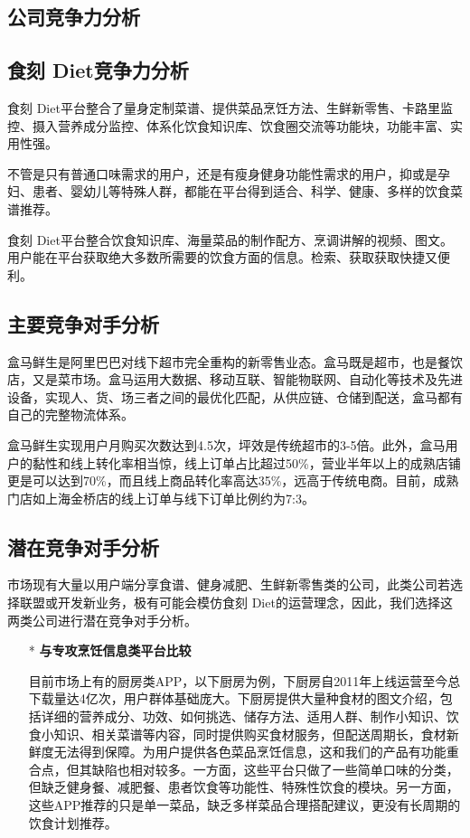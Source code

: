 \documentclass[UTF8,12pt]{ctexart}
\numberwithin{figure}{section}%
\begin{document}
\begin{spacing}{2}
\newpage
\section{公司竞争力分析}
\subsection{食刻 Diet竞争力分析}
食刻 Diet平台整合了量身定制菜谱、提供菜品烹饪方法、生鲜新零售、卡路里监控、摄入营养成分监控、体系化饮食知识库、饮食圈交流等功能块，功能丰富、实用性强。

不管是只有普通口味需求的用户，还是有瘦身健身功能性需求的用户，抑或是孕妇、患者、婴幼儿等特殊人群，都能在平台得到适合、科学、健康、多样的饮食菜谱推荐。

食刻 Diet平台整合饮食知识库、海量菜品的制作配方、烹调讲解的视频、图文。用户能在平台获取绝大多数所需要的饮食方面的信息。检索、获取获取快捷又便利。


\subsection{主要竞争对手分析}

盒马鲜生是阿里巴巴对线下超市完全重构的新零售业态。盒马既是超市，也是餐饮店，又是菜市场。盒马运用大数据、移动互联、智能物联网、自动化等技术及先进设备，实现人、货、场三者之间的最优化匹配，从供应链、仓储到配送，盒马都有自己的完整物流体系。


盒马鲜生实现用户月购买次数达到4.5次，坪效是传统超市的3-5倍。此外，盒马用户的黏性和线上转化率相当惊，线上订单占比超过50\%，营业半年以上的成熟店铺更是可以达到70\%，而且线上商品转化率高达35\%，远高于传统电商。目前，成熟门店如上海金桥店的线上订单与线下订单比例约为7:3。


\subsection{潜在竞争对手分析}

市场现有大量以用户端分享食谱、健身减肥、生鲜新零售类的公司，此类公司若选择联盟或开发新业务，极有可能会模仿食刻 Diet的运营理念，因此，我们选择这两类公司进行潜在竞争对手分析。

\begin{itemize}
	\item[*] \textbf{与专攻烹饪信息类平台比较}
	
	\setlength{\parindent}{2em}目前市场上有的厨房类APP，以下厨房为例，下厨房自2011年上线运营至今总下载量达4亿次，用户群体基础庞大。下厨房提供大量种食材的图文介绍，包括详细的营养成分、功效、如何挑选、储存方法、适用人群、制作小知识、饮食小知识、相关菜谱等内容，同时提供购买食材服务，但配送周期长，食材新鲜度无法得到保障。为用户提供各色菜品烹饪信息，这和我们的产品有功能重合点，但其缺陷也相对较多。一方面，这些平台只做了一些简单口味的分类，但缺乏健身餐、减肥餐、患者饮食等功能性、特殊性饮食的模块。另一方面，这些APP推荐的只是单一菜品，缺乏多样菜品合理搭配建议，更没有长周期的饮食计划推荐。
	

\end{itemize}
\end{spacing}
\end{document}
